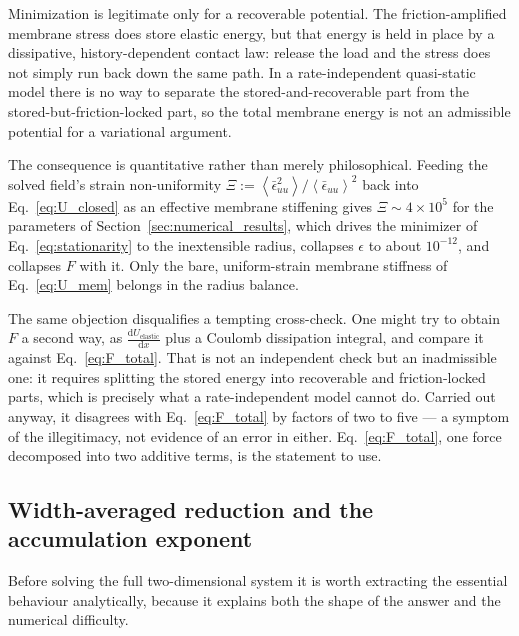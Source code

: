 \documentclass[11pt]{article}
\begin{document}
Minimization is legitimate only for a recoverable potential. The
friction-amplified membrane stress does store elastic energy, but that energy is
held in place by a dissipative, history-dependent contact law: release the load
and the stress does not simply run back down the same path. In a rate-independent
quasi-static model there is no way to separate the stored-and-recoverable part
from the stored-but-friction-locked part, so the total membrane energy is not an
admissible potential for a variational argument.

The consequence is quantitative rather than merely philosophical. Feeding the
solved field's strain non-uniformity
$\Xi := \left\langle \bar\epsilon_{uu}^{2}\right\rangle
/ \left\langle \bar\epsilon_{uu}\right\rangle^{2}$ back into
Eq.~\eqref{eq:U_closed} as an effective membrane stiffening gives
$\Xi \sim 4\times10^{5}$ for the parameters of
Section~\ref{sec:numerical_results}, which drives the minimizer of
Eq.~\eqref{eq:stationarity} to the inextensible radius, collapses $\epsilon$ to
about $10^{-12}$, and collapses $F$ with it. Only the bare, uniform-strain
membrane stiffness of Eq.~\eqref{eq:U_mem} belongs in the radius balance.

The same objection disqualifies a tempting cross-check. One might try to obtain
$F$ a second way, as $\frac{\mathrm d U_{\mathrm{elastic}}}{\mathrm d x}$ plus a
Coulomb dissipation integral, and compare it against Eq.~\eqref{eq:F_total}. That
is not an independent check but an inadmissible one: it requires splitting the
stored energy into recoverable and friction-locked parts, which is precisely what
a rate-independent model cannot do. Carried out anyway, it disagrees with
Eq.~\eqref{eq:F_total} by factors of two to five --- a symptom of the
illegitimacy, not evidence of an error in either. Eq.~\eqref{eq:F_total}, one
force decomposed into two additive terms, is the statement to use.

\subsection{Width-averaged reduction and the accumulation exponent}
\label{sec:accumulation}
Before solving the full two-dimensional system it is worth extracting the
essential behaviour analytically, because it explains both the shape of the
answer and the numerical difficulty.
\end{document}
